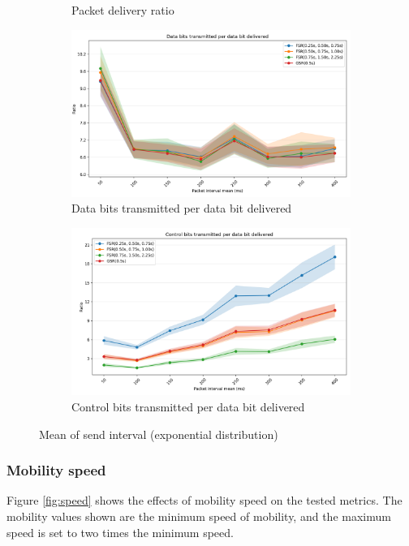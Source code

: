 \documentclass{winslabreport}
\begin{document}
\begin{figure}
\begin{subfigure}[b]{0.45\textwidth}
        \caption{Packet delivery ratio}
        \label{fig:delivery_send}
    \end{subfigure}
    \begin{subfigure}[b]{0.45\textwidth}
        \includegraphics[width=\textwidth]{../figures/sendInterval/data_bits_transmitted_per_data_bit_delivered.png}
        \caption{Data bits transmitted per data bit delivered}
        \label{fig:data_bits_send}
    \end{subfigure}
    \begin{subfigure}[b]{0.45\textwidth}
        \includegraphics[width=\textwidth]{../figures/sendInterval/control_bits_transmitted_per_data_bit_delivered.png}
        \caption{Control bits transmitted per data bit delivered}
        \label{fig:control_bits_send}
    \end{subfigure}
    \caption{Mean of send interval (exponential distribution)}
    \label{fig:send}
\end{figure}


\subsubsection{Mobility speed}
Figure \ref{fig:speed} shows the effects of mobility speed on the tested metrics. The mobility values shown are the minimum speed of mobility, and the maximum speed is set to two times the minimum speed.
\end{document}
